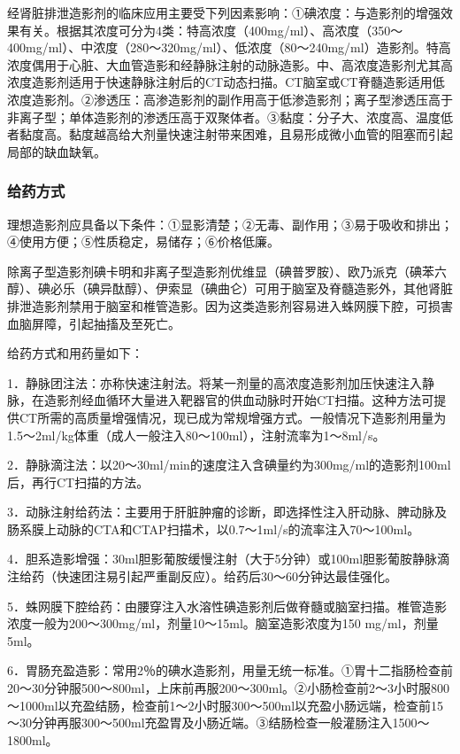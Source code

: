 经肾脏排泄造影剂的临床应用主要受下列因素影响：①碘浓度：与造影剂的增强效果有关。根据其浓度可分为4类：特高浓度（400mg/ml）、高浓度（350～400mg/ml）、中浓度（280～320mg/ml）、低浓度（80～240mg/ml）造影剂。特高浓度偶用于心脏、大血管造影和经静脉注射的动脉造影。中、高浓度造影剂尤其高浓度造影剂适用于快速静脉注射后的CT动态扫描。CT脑室或CT脊髓造影适用低浓度造影剂。②渗透压：高渗造影剂的副作用高于低渗造影剂；离子型渗透压高于非离子型；单体造影剂的渗透压高于双聚体者。③黏度：分子大、浓度高、温度低者黏度高。黏度越高给大剂量快速注射带来困难，且易形成微小血管的阻塞而引起局部的缺血缺氧。

\subsubsection{给药方式}

理想造影剂应具备以下条件：①显影清楚；②无毒、副作用；③易于吸收和排出；④使用方便；⑤性质稳定，易储存；⑥价格低廉。

除离子型造影剂碘卡明和非离子型造影剂优维显（碘普罗胺）、欧乃派克（碘苯六醇）、碘必乐（碘异酞醇）、伊索显（碘曲仑）可用于脑室及脊髓造影外，其他肾脏排泄造影剂禁用于脑室和椎管造影。因为这类造影剂容易进入蛛网膜下腔，可损害血脑屏障，引起抽搐及至死亡。

给药方式和用药量如下：

1．静脉团注法：亦称快速注射法。将某一剂量的高浓度造影剂加压快速注入静脉，在造影剂经血循环大量进入靶器官的供血动脉时开始CT扫描。这种方法可提供CT所需的高质量增强情况，现已成为常规增强方式。一般情况下造影剂用量为1.5～2ml/kg体重（成人一般注入80～100ml），注射流率为1～8ml/s。

2．静脉滴注法：以20～30ml/min的速度注入含碘量约为300mg/ml的造影剂100ml后，再行CT扫描的方法。

3．动脉注射给药法：主要用于肝脏肿瘤的诊断，即选择性注入肝动脉、脾动脉及肠系膜上动脉的CTA和CTAP扫描术，以0.7～1ml/s的流率注入70～100ml。

4．胆系造影增强：30ml胆影葡胺缓慢注射（大于5分钟）或100ml胆影葡胺静脉滴注给药（快速团注易引起严重副反应）。给药后30～60分钟达最佳强化。

5．蛛网膜下腔给药：由腰穿注入水溶性碘造影剂后做脊髓或脑室扫描。椎管造影浓度一般为200～300mg/ml，剂量10～15ml。脑室造影浓度为150
mg/ml，剂量5ml。

6．胃肠充盈造影：常用2％的碘水造影剂，用量无统一标准。①胃十二指肠检查前20～30分钟服500～800ml，上床前再服200～300ml。②小肠检查前2～3小时服800～1000ml以充盈结肠，检查前1～2小时服300～500ml以充盈小肠远端，检查前15～30分钟再服300～500ml充盈胃及小肠近端。③结肠检查一般灌肠注入1500～1800ml。

